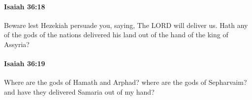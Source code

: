 		\paragraph{Isaiah 36:18} %
			\label{ISAIAH-36-18}

			Beware lest Hezekiah persuade you, saying, The LORD will deliver us. Hath any of the gods of the nations delivered his land out of the hand of the king of Assyria?


		\paragraph{Isaiah 36:19} %
			\label{ISAIAH-36-19}

			Where are the gods of Hamath and Arphad? where are the gods of Sepharvaim? and have they delivered Samaria out of my hand?


